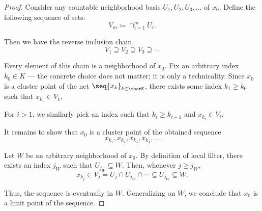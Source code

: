 \begin{proof}
  Consider any countable neighborhood basis \( U_1, U_2, U_3, \ldots \) of \( x_0 \). Define the following sequence of sets:
  \begin{equation*}
    V_m \coloneqq \cap_{i=1}^m U_i.
  \end{equation*}

  Then we have the reverse inclusion chain
  \begin{equation*}
    V_1 \supseteq V_2 \supseteq V_3 \supseteq \cdots
  \end{equation*}

  Every element of this chain is a neighborhood of \( x_0 \). Fix an arbitrary index \( k_0 \in K \) --- the concrete choice does not matter; it is only a technicality. Since \( x_0 \) is a cluster point of the net \( \seq{ x_k }_{k \in \mscrK} \), there exists some index \( k_1 \geq k_0 \) such that \( x_{k_1} \in V_1 \).

  For \( i > 1 \), we similarly pick an index such that \( k_i \geq k_{i-1} \) and \( x_{k_i} \in V_i \).

  It remains to show that \( x_0 \) is a cluster point of the obtained sequence
  \begin{equation*}
    x_{k_1}, x_{k_2}, x_{k_3}, x_{k_4}, \ldots
  \end{equation*}

  Let \( W \) be an arbitrary neighborhood of \( x_0 \). By definition of local filter, there exists an index \( j_W \) such that \( U_{j_W} \subseteq W \). Then, whenever \( j \geq j_W \),
  \begin{equation*}
    x_{k_j} \in V_j = U_j \cap U_{j_W} \cap \cdots \subseteq U_{j_W} \subseteq W.
  \end{equation*}

  Thus, the sequence is eventually in \( W \). Generalizing on \( W \), we conclude that \( x_0 \) is a limit point of the sequence.
\end{proof}
